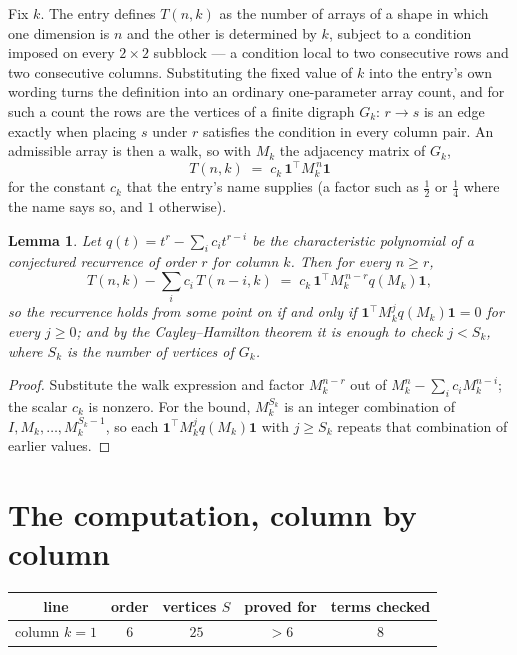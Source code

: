 \documentclass[11pt,a4paper]{article}
\theoremstyle{plain}
\newtheorem{lemma}[theorem]{Lemma}
\theoremstyle{definition}
\begin{document}
Fix $k$. The entry defines $T(n,k)$ as the number of arrays of a shape in which one dimension
is $n$ and the other is determined by $k$, subject to a condition imposed on every
$2\times2$ subblock --- a condition local to two consecutive rows and two consecutive columns.
Substituting the fixed value of $k$ into the entry's own wording turns the definition into an
ordinary one-parameter array count, and for such a count the rows are the vertices of a finite
digraph $G_k$: $r\to s$ is an edge exactly when placing $s$ under $r$ satisfies the condition
in every column pair. An admissible array is then a walk, so with $M_k$ the adjacency matrix
of $G_k$,
\[
T(n,k)\;=\;c_k\,\mathbf{1}^{\!\top}M_k^{\,n}\mathbf{1}
\]
for the constant $c_k$ that the entry's name supplies (a factor such as $\tfrac12$ or
$\tfrac14$ where the name says so, and $1$ otherwise).

\begin{lemma}\label{lem:crit}
Let $q(t)=t^{r}-\sum_i c_it^{r-i}$ be the characteristic polynomial of a conjectured
recurrence of order $r$ for column $k$. Then for every $n\ge r$,
\[
T(n,k)-\sum_i c_i\,T(n-i,k)\;=\;c_k\,\mathbf{1}^{\!\top}M_k^{\,n-r}q(M_k)\mathbf{1},
\]
so the recurrence holds from some point on if and only if
$\mathbf{1}^{\!\top}M_k^{j}q(M_k)\mathbf{1}=0$ for every $j\ge0$; and by the
Cayley--Hamilton theorem it is enough to check $j<S_k$, where $S_k$ is the number of vertices
of $G_k$.
\end{lemma}

\begin{proof}
Substitute the walk expression and factor $M_k^{n-r}$ out of $M_k^{n}-\sum_ic_iM_k^{n-i}$;
the scalar $c_k$ is nonzero. For the bound, $M_k^{S_k}$ is an integer combination of
$I,M_k,\dots,M_k^{S_k-1}$, so each $\mathbf{1}^{\!\top}M_k^{j}q(M_k)\mathbf{1}$ with
$j\ge S_k$ repeats that combination of earlier values.
\end{proof}

\section{The computation, column by column}

\begin{center}
\begin{tabular}{ccccc}
line & order & vertices $S$ & proved for & terms checked \\ \hline
column $k$$=1$ & $6$ & $25$ & $>6$ & $8$ \\
\end{tabular}
\end{center}
\end{document}
